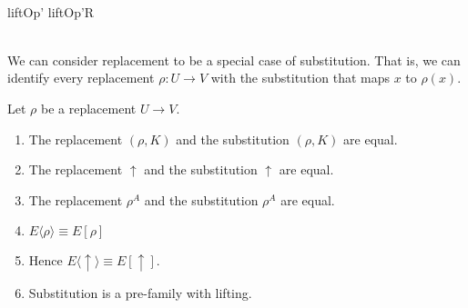 \begin{code}%
\>  \<%
\\
%
\\
\>  \AgdaSymbol{(} \AgdaSymbol{:} \AgdaSymbol{)} \<%
\\
\>  \<%
\\
\>  \<%
\\
\>  \<%
\\
\>   \<%
\\
\>   \<%
\\
\>   \<%
\\
\>   \<%
\\
%
\\
\>    \AgdaSymbol{()}  \AgdaSymbol{(}liftOp'  liftOp'R\AgdaSymbol{)}\<%
\\
\>  \<%
\\
\>  \<%
\end{code}

We can consider replacement to be a special case of substitution.  That is,
we can identify every replacement $\rho : U \rightarrow V$ with the substitution
that maps $x$ to $\rho(x)$.  
\begin{lemma}
Let $\rho$ be a replacement $U \rightarrow V$.
\begin{enumerate}
\item
The replacement $(\rho , K)$ and the substitution $(\rho , K)$ are equal.
\item
The replacement $\uparrow$ and the substitution $\uparrow$ are equal.
\item
The replacement $\rho^A$ and the substitution $\rho^A$ are equal.
\item
$ E \langle \rho \rangle \equiv E [ \rho ] $
\item
Hence $ E \langle \uparrow \rangle \equiv E [ \uparrow ]$.
\item
Substitution is a pre-family with lifting.
\end{enumerate}
\end{lemma}

